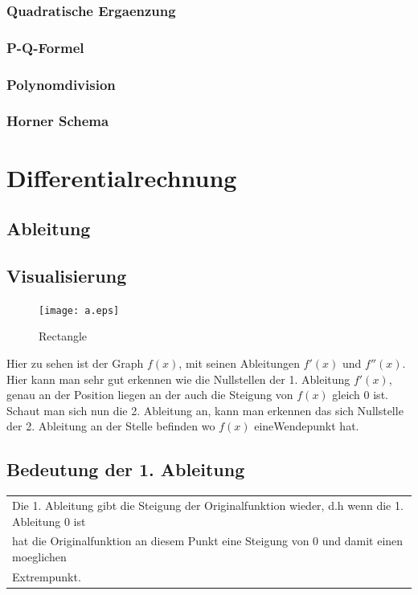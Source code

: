 \documentclass[a4paper]{article} %
\begin{document}
		\subsubsection{Quadratische Ergaenzung}
		\subsubsection{P-Q-Formel}
		\subsubsection{Polynomdivision}
		\subsubsection{Horner Schema}
	\newpage
	\section{Differentialrechnung}
	\subsection{Ableitung}
	\subsection{Visualisierung}
	

	\begin{minipage}{0.3\textwidth}
	\begin{figure}[H]
	\texttt{[image: a.eps]}
	\caption{Rectangle}
	\end{figure}
	\end{minipage} \hfill
	\begin{minipage}{0.5\textwidth}
	
	Hier zu sehen ist der Graph $f(x)$, mit seinen Ableitungen $f'(x)$ und $f''(x)$.
	Hier kann man sehr gut erkennen wie die Nullstellen der 1. Ableitung $f'(x)$, genau an
	der Position liegen an der auch die Steigung von $f(x)$ gleich 0 ist.\\
	Schaut man sich nun die 2. Ableitung an, kann man erkennen das sich Nullstelle der 2. Ableitung an der Stelle befinden wo $f(x)$ eineWendepunkt hat.
	
	\end{minipage}


			
		
	\subsection{Bedeutung der 1. Ableitung}
	\begin{tabular}[t]{l}
	Die 1. Ableitung gibt die Steigung der Originalfunktion wieder, d.h wenn die 1. Ableitung 0 ist \\hat die Originalfunktion an diesem Punkt eine 
	Steigung von 0 und damit einen moeglichen \\Extrempunkt.
	\end{tabular}
\end{document}
